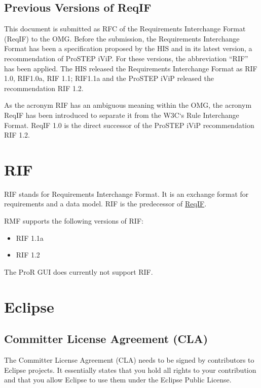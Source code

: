 \subsection{Previous Versions of ReqIF}

This document is submitted as RFC of the Requirements Interchange Format
(ReqIF) to the OMG. Before the submission, the Requirements Interchange
Format has been a specification proposed by the HIS and in its latest
version, a recommendation of ProSTEP iViP. For these versions, the
abbreviation ``RIF'' has been applied. The HIS released the Requirements
Interchange Format as RIF 1.0, RIF1.0a, RIF 1.1; RIF1.1a and the ProSTEP
iViP released the recommendation RIF 1.2.

As the acronym RIF has an ambiguous meaning within the OMG, the acronym
ReqIF has been introduced to separate it from the W3C`s Rule Interchange
Format. ReqIF 1.0 is the direct successor of the ProSTEP iViP
recommendation RIF 1.2.

\section{RIF}

RIF stands for Requirements Interchange Format. It is an exchange format
for requirements and a data model. RIF is the predecessor of
\href{RMF/ReqIF}{ReqIF}.

RMF supports the following versions of RIF:

\begin{itemize}
\item
  RIF 1.1a
\item
  RIF 1.2
\end{itemize}

The ProR GUI does currently not support RIF.

\section{Eclipse}

\subsection{Committer License Agreement (CLA)}

The Committer License Agreement (CLA) needs to be signed by contributors to Eclipse projects.  It essentially states that you hold all rights to your contribution and that you allow Eclipse to use them under the Eclipse Public License.


